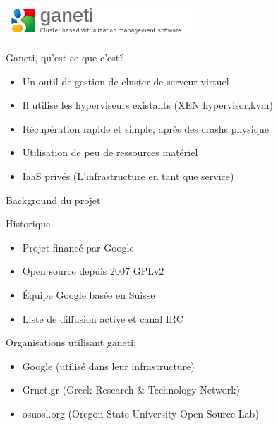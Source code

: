 

%

\begin{frame}
  \begin{center}
   \includegraphics[width=200pt]{images/logo_ganeti.png}
  \end{center}
\end{frame}

\begin{frame}{Ganeti, qu'est-ce que c'est?}
\begin{itemize}
\item Un outil de gestion de cluster de serveur virtuel
\pause
\item Il utilise les hyperviseurs existants (XEN hypervisor,kvm)
\pause
\item Récupération rapide et simple, après des crashs physique
\pause
\item Utilisation de peu de ressources matériel
\pause
\item IaaS privés (L'infrastructure en tant que service)
\end{itemize}
\end{frame}



\begin{frame}{Background du projet}
\begin{block}{Historique}
  \begin{itemize}
  \item Projet financé par Google
\pause
  \item Open source depuis 2007 GPLv2
\pause
  \item Équipe Google basée en Suisse
\pause
  \item Liste de diffusion active et canal IRC
\pause
  \end{itemize}
\end{block}
\begin{block}{Organisations utilisant ganeti:}
  \begin{itemize}
  \item Google (utilisé dans leur infrastructure)
\pause
  \item Grnet.gr (Greek Research \& Technology Network)
\pause
  \item osuosl.org (Oregon State University Open Source Lab)
  \end{itemize}
\end{block}
\end{frame}

